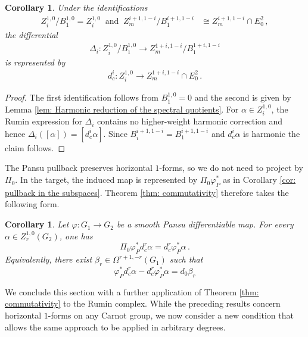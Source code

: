 \documentclass[dvipsnames]{amsart}
\newtheorem{corollary}[theorem]{Corollary}
\theoremstyle{definition}
\theoremstyle{definition}
\numberwithin{equation}{section}
\begin{document}
\begin{corollary}\label{cor: Delta_i on 1-forms}
    Under the identifications
\begin{align*}
    Z_i^{1,0}\big/ B_1^{1,0} = Z_i^{1,0}\ \text{ and }\
    Z_m^{i+1,1-i}\big / B_1^{i+1,1-i} &\cong  Z_m^{i+1,1-i} \cap E_0^2\,,
\end{align*}
the differential 
\begin{align*}
    \Delta_i\colon Z_i^{1,0}/B_1^{1,0}\longrightarrow Z_m^{1+i,1-i}/B_1^{1+i,1-i}
\end{align*}
is represented by
\begin{align*}
    d_c^i \colon Z_i^{1,0}\longrightarrow Z_m^{1+i,1-i}\cap E_0^2\,.
\end{align*}
\end{corollary}
\begin{proof}
    The first identification follows from $B_1^{1,0} = 0$ and the second is given by Lemma \ref{lem: Harmonic reduction of the spectral quotients}. For $\alpha \in Z_i^{1,0}$, the Rumin expression for $\Delta_i$ contains no higher-weight harmonic correction and hence $\Delta_i([\alpha]) = [d_c^i \alpha]$. Since $B_i^{i+1, 1-i} = B_1^{i+1, 1-i}$ and $d_c^i \alpha$ is harmonic the claim follows.
\end{proof}

The Pansu pullback preserves horizontal $1$-forms, so we do not need to project by $\Pi_0$. In the target, the induced map is represented by $\Pi_0 \varphi_P^*$ as in Corollary \ref{cor: pullback in the subspaces}. Theorem \ref{thm: commutativity} therefore takes the following form.

\begin{corollary}\label{cor: pullback commuta con diff rumin 1-forms}
    Let $\varphi : G_1 \rightarrow G_2$ be a smooth Pansu differentiable map. For every $\alpha \in Z_r^{1,0}(G_2)$, one has
    \begin{equation*}
        \Pi_0 \varphi_P^* d_c^r \alpha = d_c^r \varphi_P^* \alpha \,.
    \end{equation*}
    Equivalently, there exist $\beta_r \in \Omega^{r+1,-r}(G_1)$ such that 
    \begin{equation*}
        \varphi_P^* d_c^r \alpha - d_c^r \varphi_P^*\alpha =d_0 \beta_r 
    \end{equation*}
\end{corollary}

We conclude this section with a further application of Theorem \ref{thm: commutativity} to the Rumin complex. While the preceding results concern horizontal $1$-forms on any Carnot group, we now consider a new condition that allows the same approach to be applied in arbitrary degrees.
\end{document}
